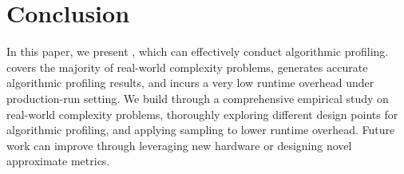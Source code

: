 \section{Conclusion}
\label{sec:con}

In this paper, we present \Tool, which can effectively conduct algorithmic profiling.
\Tool covers the majority of real-world complexity problems, 
generates accurate algorithmic profiling results, 
and incurs a very low runtime overhead under production-run setting. 
We build \Tool through a comprehensive empirical study on real-world complexity problems, 
thoroughly exploring different design points for algorithmic profiling, 
and applying sampling to lower runtime overhead. 
Future work can improve \Tool through leveraging 
new hardware or designing novel approximate metrics. 
